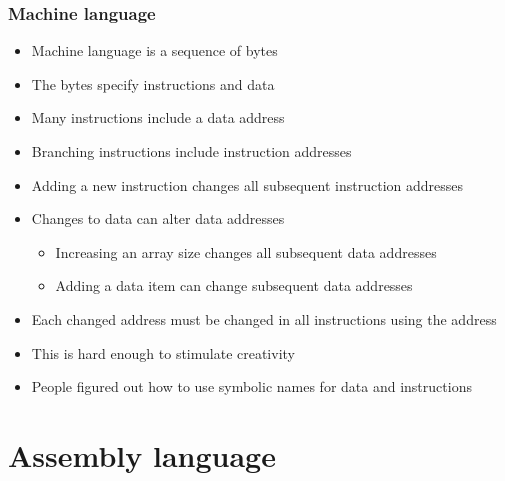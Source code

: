 \documentclass{beamer}
\begin{document}
\begin{frame}
    \frametitle{Machine language}
    \begin{itemize}
        \item Machine language is a sequence of bytes
        \item The bytes specify instructions and data
        \item Many instructions include a data address
        \item Branching instructions include instruction addresses
        \item Adding a new instruction changes all subsequent instruction addresses
        \item Changes to data can alter data addresses
            \begin{itemize}
                \item Increasing an array size changes all subsequent data addresses
                \item Adding a data item can change subsequent data addresses
            \end{itemize}
        \item Each changed address must be changed in all instructions using the address
        \item This is hard enough to stimulate creativity
        \item People figured out how to use symbolic names for data and instructions
    \end{itemize}
\end{frame}

\section{Assembly language}
\end{document}
